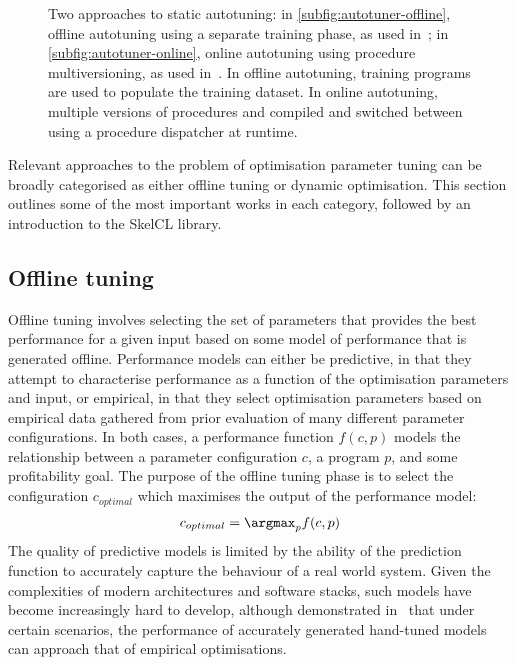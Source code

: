 \begin{figure*}[t]

\caption{Two approaches to static autotuning: in
  \ref{subfig:autotuner-offline}, offline autotuning using a separate
  training phase, as used in~\cite{Agakov, Fursin2011, Collins2013};
  in \ref{subfig:autotuner-online}, online autotuning using procedure
  multiversioning, as used in~\cite{Fursin2005}. In offline
  autotuning, training programs are used to populate the training
  dataset. In online autotuning, multiple versions of procedures and
  compiled and switched between using a procedure dispatcher at
  runtime.}
\label{fig:autotuners}
\end{figure*}

Relevant approaches to the problem of optimisation parameter tuning
can be broadly categorised as either offline tuning or dynamic
optimisation. This section outlines some of the most important works
in each category, followed by an introduction to the SkelCL library.

\subsection{Offline tuning}\label{subsec:offline-tuning}
Offline tuning involves selecting the set of parameters that provides
the best performance for a given input based on some model of
performance that is generated offline. Performance models can either
be predictive, in that they attempt to characterise performance as a
function of the optimisation parameters and input, or empirical, in
that they select optimisation parameters based on empirical data
gathered from prior evaluation of many different parameter
configurations. In both cases, a performance function $f(c,p)$ models
the relationship between a parameter configuration $c$, a program $p$,
and some profitability goal. The purpose of the offline tuning phase
is to select the configuration $c_{optimal}$ which maximises the
output of the performance model:
\begin{align*}
  c_{optimal} = \argmax_{p}f(c,p)
\end{align*}
The quality of predictive models is limited by the ability of the
prediction function to accurately capture the behaviour of a real
world system. Given the complexities of modern architectures and
software stacks, such models have become increasingly hard to develop,
although \citeauthor{Yotov2003} demonstrated in~\cite{Yotov2003} that
under certain scenarios, the performance of accurately generated
hand-tuned models can approach that of empirical optimisations.

